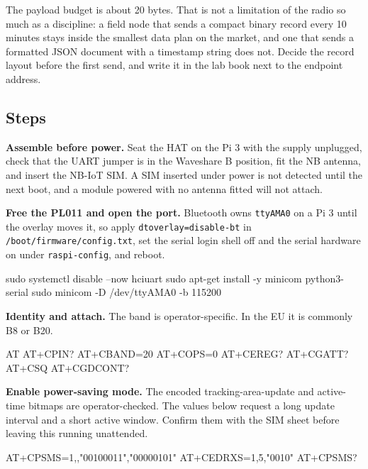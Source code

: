 The payload budget is about 20 bytes. That is not a limitation of the radio so much as a discipline: a field node that sends a compact binary record every 10 minutes stays inside the smallest data plan on the market, and one that sends a formatted JSON document with a timestamp string does not. Decide the record layout before the first send, and write it in the lab book next to the endpoint address.

\subsection*{Steps}

\begin{steps}
\item \textbf{Assemble before power.} Seat the HAT on the Pi 3 with the supply unplugged, check that the UART jumper is in the Waveshare B position, fit the NB antenna, and insert the NB-IoT SIM. A SIM inserted under power is not detected until the next boot, and a module powered with no antenna fitted will not attach.

\item \textbf{Free the PL011 and open the port.} Bluetooth owns \texttt{ttyAMA0} on a Pi 3 until the overlay moves it, so apply \texttt{dtoverlay=disable-bt} in \texttt{/boot/firmware/config.txt}, set the serial login shell off and the serial hardware on under \texttt{raspi-config}, and reboot.
\begin{shellcode}
sudo systemctl disable --now hciuart
sudo apt-get install -y minicom python3-serial
sudo minicom -D /dev/ttyAMA0 -b 115200
\end{shellcode}

\item \textbf{Identity and attach.} The band is operator-specific. In the EU it is commonly B8 or B20.
\begin{atcode}
AT
AT+CPIN?
AT+CBAND=20
AT+COPS=0
AT+CEREG?
AT+CGATT?
AT+CSQ
AT+CGDCONT?
\end{atcode}

\item \textbf{Enable power-saving mode.} The encoded tracking-area-update and active-time bitmaps are operator-checked. The values below request a long update interval and a short active window. Confirm them with the SIM sheet before leaving this running unattended.
\begin{atcode}
AT+CPSMS=1,,"00100011","00000101"
AT+CEDRXS=1,5,"0010"
AT+CPSMS?
\end{atcode}


\end{steps}

